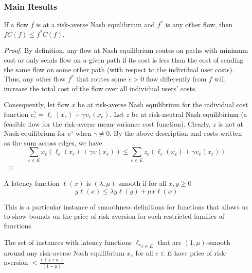 \subsubsection{Main Results}
\begin{theorem}
    If a flow $f$ is at a risk-averse Nash equilibrium and $f^*$ is any other flow, then $fC(f)\leq f^*C(f)$. 
    \label{variational}
\end{theorem}

\begin{proof}
    By definition, any flow at Nash equilibrium routes on paths with minimum cost or only sends flow on a given path if its cost is less than
    the cost of sending the same flow on some other path (with respect to the individual user costs). 
    Thus, any other flow $f^*$ that routes some $\epsilon > 0$ flow differently from $f$ will increase the total cost of the flow over all individual users' costs.

    Consequently, let flow $x$ be at risk-averse Nash equilibrium for the individual cost function $c^\gamma_e = \ell_e(x_e) +\gamma \upsilon_e(x_e)$. Let $z$ be at risk-neutral Nash equilibirium (a feasible flow for the risk-averse mean-variance cost function). 
    Clearly, $z$ is not at Nash equilibrium for $c^\gamma$ when $\gamma \neq 0$. 
    By the above description and costs written as the sum across edges, we have
    $$\sum_{e \in E}x_e(\ell_e(x_e) + \gamma \upsilon(x_e)) \leq \sum_{e \in E} z_e(\ell_e(x_e) + \gamma \upsilon_e(x_e))$$
\end{proof}

\begin{definition}
    A latency function $\ell(x)$ is $(\lambda, \mu)$-smooth if for all $x, y \geq 0$ $$ y\ell(x) \leq \lambda y\ell(y) + \mu x \ell(x)$$
    
    This is a particular instance of smoothness definitions for functions that allows us to show bounds on the price of risk-aversion for such restricted families of functions. 
\end{definition}

\begin{theorem}
    The set of instances with latency functions ${\ell_e}_{e \in E}$ that are $(1,\mu)$-smooth around any risk-averse Nash equilibrium $x_e$ for all $e \in E$ have price of risk-aversion
    $\leq \displaystyle \frac{(1 + \gamma \upkappa)}{(1 - \mu)}$
\end{theorem}

